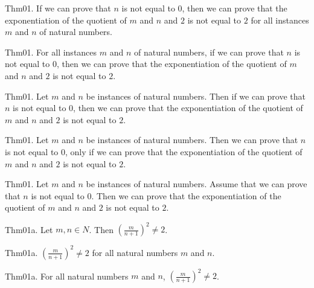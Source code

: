 \documentclass{article}
\begin{document}
Thm01. If we can prove that $n$ is not equal to $0$, then we can prove that the exponentiation of the quotient of $m$ and $n$ and $2$ is not equal to $2$ for all instances $m$ and $n$ of natural numbers.

Thm01. For all instances $m$ and $n$ of natural numbers, if we can prove that $n$ is not equal to $0$, then we can prove that the exponentiation of the quotient of $m$ and $n$ and $2$ is not equal to $2$.

Thm01. Let $m$ and $n$ be instances of natural numbers. Then if we can prove that $n$ is not equal to $0$, then we can prove that the exponentiation of the quotient of $m$ and $n$ and $2$ is not equal to $2$.

Thm01. Let $m$ and $n$ be instances of natural numbers. Then we can prove that $n$ is not equal to $0$, only if we can prove that the exponentiation of the quotient of $m$ and $n$ and $2$ is not equal to $2$.

Thm01. Let $m$ and $n$ be instances of natural numbers. Assume that we can prove that $n$ is not equal to $0$. Then we can prove that the exponentiation of the quotient of $m$ and $n$ and $2$ is not equal to $2$.

Thm01a. Let $m , n \in N$. Then $(\frac{ m}{n + 1})^ {2}\neq 2$.

Thm01a. $(\frac{ m}{n + 1})^ {2}\neq 2$ for all natural numbers $m$ and $n$.

Thm01a. For all natural numbers $m$ and $n$, $(\frac{ m}{n + 1})^ {2}\neq 2$.
\end{document}
